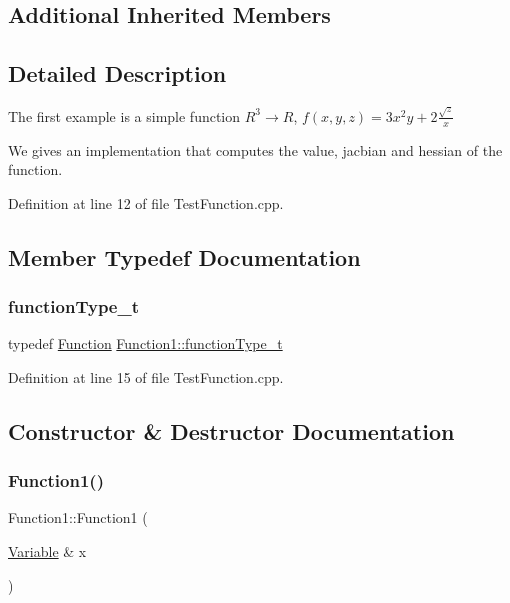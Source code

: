 \subsection*{Additional Inherited Members}


\subsection{Detailed Description}
The first example is a simple function $ R^3 \rightarrow R $, $ f(x,y,z) = 3x^2y+2\frac{\sqrt{z}}{x}$

We gives an implementation that computes the value, jacbian and hessian of the function. 

Definition at line 12 of file Test\+Function.\+cpp.



\subsection{Member Typedef Documentation}
\hypertarget{classFunction1_a3248b79eedbe37ed0e285db564a530fe}{}\label{classFunction1_a3248b79eedbe37ed0e285db564a530fe} 
\subsubsection{\texorpdfstring{function\+Type\+\_\+t}{functionType\_t}}
{\footnotesize\ttfamily typedef \hyperlink{classocra_1_1Function}{Function} \hyperlink{classFunction1_a3248b79eedbe37ed0e285db564a530fe}{Function1\+::function\+Type\+\_\+t}}



Definition at line 15 of file Test\+Function.\+cpp.



\subsection{Constructor \& Destructor Documentation}
\hypertarget{classFunction1_a6b618d85fab472effe2624a8384c1674}{}\label{classFunction1_a6b618d85fab472effe2624a8384c1674} 
\subsubsection{\texorpdfstring{Function1()}{Function1()}}
{\footnotesize\ttfamily Function1\+::\+Function1 (\begin{DoxyParamCaption}\item[{\hyperlink{classocra_1_1Variable}{Variable} \&}]{x }\end{DoxyParamCaption})\hspace{0.3cm}{\ttfamily [inline]}}



